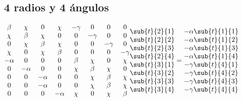 \subsection{4 radios y 4 ángulos}
\(
\begin{matrix}
  \beta & \chi & 0 & \chi & -\gamma & 0 & 0 & 0 \\
  \chi & \beta & \chi & 0 & 0 & -\gamma & 0 & 0 \\
  0 & \chi & \beta & \chi & 0 & 0 & -\gamma & 0 \\
  \chi & 0 & \chi & \beta & 0 & 0 & 0 & -\gamma \\
  -\alpha & 0 & 0 & 0 & \beta & \chi & 0 & \chi \\
  0 & -\alpha & 0 & 0 & \chi & \beta & \chi & 0 \\
  0 & 0 & -\alpha & 0 & 0 & \chi & \beta & \chi \\
  0 & 0 & -\alpha & 0 & 0 & \chi & \beta & \chi \\
  0 & 0 & 0 & -\alpha & \chi & 0 & \chi & \beta \\
\end{matrix} \begin{matrix}
  \sub{t}{2}{1} \\
  \sub{t}{2}{2} \\
  \sub{t}{2}{3} \\
  \sub{t}{2}{4} \\
  \sub{t}{3}{1} \\
  \sub{t}{3}{2} \\
  \sub{t}{3}{3} \\
  \sub{t}{3}{4} \\
\end{matrix} = \begin{matrix}
  -\alpha \sub{t}{1}{1} \\
  -\alpha \sub{t}{1}{2} \\
  -\alpha \sub{t}{1}{3} \\
  -\alpha \sub{t}{1}{4} \\
  -\gamma \sub{t}{4}{1} \\
  -\gamma \sub{t}{4}{2} \\
  -\gamma \sub{t}{4}{3} \\
  -\gamma \sub{t}{4}{4} \\
\end{matrix} \\
\)
